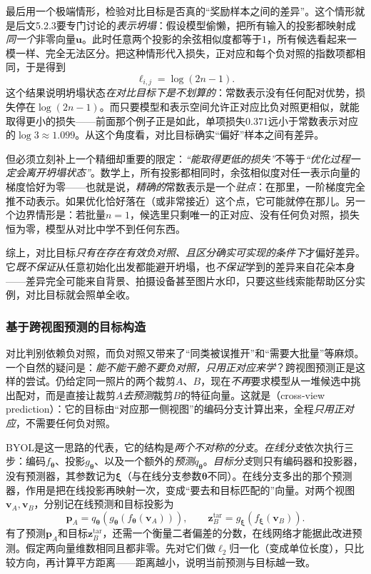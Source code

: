 最后用一个极端情形，检验对比目标是否真的“奖励样本之间的差异”。这个情形就是后文5.2.3要专门讨论的\emph{表示坍塌}：假设模型偷懒，把所有输入的投影都映射成\emph{同一个}非零向量$\bm{u}$。此时任意两个投影的余弦相似度都等于$1$，所有候选看起来一模一样、完全无法区分。把这种情形代入损失，正对应和每个负对照的指数项都相同，于是得到
\[
  \ell_{i,j}=\log(2n-1).
\]
这个结果说明坍塌状态\emph{在对比目标下是不划算的}：常数表示没有任何配对优势，损失停在$\log(2n-1)$。而只要模型和表示空间允许正对应比负对照更相似，就能取得更小的损失——前面那个例子正是如此，单项损失$0.371$远小于常数表示对应的$\log3\approx1.099$。从这个角度看，对比目标确实“偏好”样本之间有差异。

但必须立刻补上一个精细却重要的限定：\emph{“能取得更低的损失”}不等于\emph{“优化过程一定会离开坍塌状态”}。数学上，所有投影都相同时，余弦相似度对任一表示向量的梯度恰好为零——也就是说，\emph{精确的}常数表示是一个\emph{驻点}：在那里，一阶梯度完全推不动表示。如果优化恰好落在（或非常接近）这个点，它可能就停在那儿。另一个边界情形是：若批量$n=1$，候选里只剩唯一的正对应、没有任何负对照，损失恒为零，模型从对比中学不到任何东西。

综上，对比目标\emph{只有在存在有效负对照、且区分确实可实现的条件下}才偏好差异。它\emph{既不保证}从任意初始化出发都能避开坍塌，也\emph{不保证}学到的差异来自花朵本身——差异完全可能来自背景、拍摄设备甚至图片水印，只要这些线索能帮助区分实例，对比目标就会照单全收。

\subsubsection{基于跨视图预测的目标构造}
\label{sec:data-derived-knowledge-cross-view-prediction}

对比判别依赖负对照，而负对照又带来了“同类被误推开”和“需要大批量”等麻烦。一个自然的疑问是：\emph{能不能干脆不要负对照，只用正对应来学}？跨视图预测正是这样的尝试。仍给定同一照片的两个裁剪$A$、$B$，现在\emph{不再}要求模型从一堆候选中挑出配对，而是直接让裁剪$A$\emph{去预测}裁剪$B$的特征向量。这就是（cross-view prediction）：它的目标由“对应那一侧视图”的编码分支计算出来，全程\emph{只用正对应}，不需要任何负对照。

BYOL是这一思路的代表，它的结构是\emph{两个不对称的分支}。\emph{在线分支}依次执行三步：编码$f_{\bm{\theta}}$、投影$g_{\bm{\theta}}$、以及一个额外的\emph{预测}$q_{\bm{\theta}}$。\emph{目标分支}则只有编码器和投影器，没有预测器，其参数记为$\bm{\xi}$（与在线分支参数$\bm{\theta}$不同）。在线分支多出的那个预测器，作用是把在线投影再映射一次，变成“要去和目标匹配的”向量。对两个视图$\bm{v}_A,\bm{v}_B$，分别记在线预测和目标投影为
\[
  \bm{p}_A=q_{\bm{\theta}}\!\left(g_{\bm{\theta}}(f_{\bm{\theta}}(\bm{v}_A))\right),
  \qquad
  \bm{z}^{\mathrm{tar}}_B=g_{\bm{\xi}}(f_{\bm{\xi}}(\bm{v}_B)).
\]
有了预测$\bm{p}_A$和目标$\bm{z}^{\mathrm{tar}}_B$，还需一个衡量二者偏差的分数，在线网络才能据此改进预测。假定两向量维数相同且都非零。先对它们做$\ell_2$归一化（变成单位长度），只比较方向，再计算平方距离——距离越小，说明当前预测与目标越一致。

